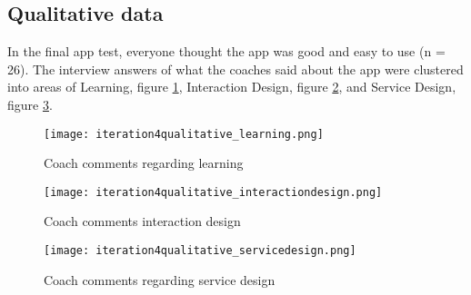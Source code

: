 \subsection{Qualitative data}

In the final app test, everyone thought the app was good and easy to use (n = 26). The interview answers of what the coaches said about the app were clustered into areas of Learning, figure \ref{fig:learning}, Interaction Design, figure \ref{fig:interactiondesign}, and Service Design, figure \ref{fig:servicedesign}.

\begin{figure}[h]
    \centering
    \texttt{[image: iteration4qualitative\_learning.png]}
    \caption{Coach comments regarding learning}
    \label{fig:learning}
\end{figure}

\begin{figure}[h]
    \centering
    \texttt{[image: iteration4qualitative\_interactiondesign.png]}
    \caption{Coach comments interaction design}
    \label{fig:interactiondesign}
\end{figure}

\begin{figure}[h]
    \centering
    \texttt{[image: iteration4qualitative\_servicedesign.png]}
    \caption{Coach comments regarding service design}
    \label{fig:servicedesign}
\end{figure}
